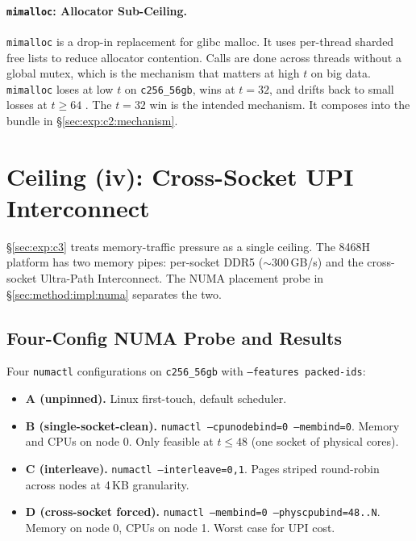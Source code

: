 \paragraph{\texttt{mimalloc}: Allocator Sub-Ceiling.}\label{sec:exp:c3:mimalloc}

\texttt{mimalloc} is a drop-in replacement for glibc malloc. It uses per-thread sharded free lists to reduce allocator contention. Calls are done across threads without a global mutex, which is the mechanism that matters at high $t$ on big data. \texttt{mimalloc} loses at low $t$ on \texttt{c256\_56gb}, wins at $t{=}32$, and drifts back to small losses at $t \geq 64$ . The $t{=}32$ win is the intended mechanism. It composes into the bundle in §\ref{sec:exp:c2:mechanism}.

\section{Ceiling (iv): Cross-Socket UPI Interconnect\label{sec:exp:c4}}

§\ref{sec:exp:c3} treats memory-traffic pressure as a single ceiling. The 8468H platform has two memory pipes: per-socket DDR5 (${\sim}300$\,GB/s) and the cross-socket Ultra-Path Interconnect. The NUMA placement probe in §\ref{sec:method:impl:numa} separates the two.

\subsection{Four-Config NUMA Probe and Results}

Four \texttt{numactl} configurations on \texttt{c256\_56gb} with \texttt{--features packed-ids}:

\begin{itemize}
  \item \textbf{A (unpinned).} Linux first-touch, default scheduler.
  \item \textbf{B (single-socket-clean).} \texttt{numactl --cpunodebind=0 --membind=0}. Memory and CPUs on node 0. Only feasible at $t \le 48$ (one socket of physical cores).
  \item \textbf{C (interleave).} \texttt{numactl --interleave=0,1}. Pages striped round-robin across nodes at 4\,KB granularity.
  \item \textbf{D (cross-socket forced).} \texttt{numactl --membind=0 --physcpubind=48..N}. Memory on node 0, CPUs on node 1. Worst case for UPI cost.
\end{itemize}

